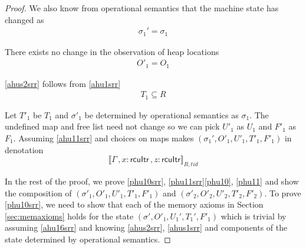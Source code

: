\begin{proof}
We also know from operational semantics that the machine state has changed as
\begin{gather}\label{ahussrr}
\sigma_1' =  \sigma_1
\end{gather}

There exists no change in the observation of heap locations
\begin{gather}\label{ahus1srr}
  O'_1 =  O_1
\end{gather}

\ref{ahus2srr} follows from \ref{ahu1srr}
\begin{gather}\label{ahus2srr}
  T_1 \subseteq R
\end{gather}

Let $T'_1$ be $T_1$ and $\sigma'_1$ be determined by operational semantics as $\sigma_1$. The undefined map and free list need not change so we can pick $U'_1$ as $U_1$ and $F'_1$ as $F_1$. Assuming \ref{ahu11srr} and choices on maps makes $(\sigma_1',O'_{1},U'_{1}, T'_{1},F'_1)$ in denotation
\[ \llbracket \Gamma\,, x:\textsf{rcuItr} \, , z:\textsf{rcuItr}  \rrbracket_{R,tid}\]

In the rest of the proof, we prove \ref{phu10srr}, \ref{phu11srr}\ref{phu10}, \ref{phu11} and show the composition of $(\sigma'_1, O'_1, U'_1,T'_1,F'_1)$ and  $(\sigma'_2, O'_2, U'_2,T'_2,F'_2)$. To prove \ref{phu10srr}, we need to show that each of the memory axioms in Section \ref{sec:memaxioms} holds for the state $(\sigma',O'_1,U_1',T_1',F'_1)$ which is trivial by assuming \ref{ahu16srr} and knowing \ref{ahus2srr}, \ref{ahus1srr} and components of the state determined by operational semantics.


\end{proof}
